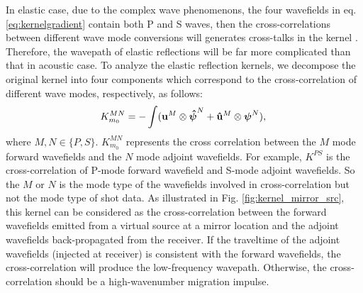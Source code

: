 In elastic case, due to the complex wave phenomenons, the four wavefields in eq.
\eqref{eq:kernelgradient} contain both P and S waves, then the cross-correlations between
different wave mode conversions will generates cross-talks in the kernel \cite[]{Wang2017ERTI}. Therefore, the wavepath of elastic reflections will 
be far more complicated than that in acoustic case.
To analyze the elastic reflection kernels, 
we decompose the original kernel into four components which 
correspond to the cross-correlation of different wave modes, respectively, as follows:
\begin{equation}
    K_{m_0}^{MN}     
    =-\int(\mathbf{u}^M\otimes\boldsymbol{{}\hat\psi}^N
	+\mathbf{\hat{u}}^M\otimes\boldsymbol{{}\psi}^N),\\
    \label{eq:decompkernel} 
\end{equation}
where $M,N\in\{P,S\}$.
$K_{m_0}^{MN}$ represents the cross correlation between the $M$ mode forward wavefields and the 
$N$ mode adjoint wavefields. 
For example, $K^{PS}$ is the
cross-correlation of P-mode forward wavefield and S-mode adjoint wavefields. So the $M$ or $N$ is
the mode type of the wavefields involved in cross-correlation but not 
the mode type of shot data.
As illustrated in Fig. \ref{fig:kernel_mirror_src}, this
kernel can be considered as the cross-correlation between the forward wavefields
emitted from a virtual source at a mirror location and the adjoint wavefields
back-propagated from the receiver. If the traveltime of the adjoint wavefields (injected at
receiver) is consistent with the forward wavefields, the cross-correlation will
produce the low-frequency wavepath. Otherwise, the cross-correlation
should be a high-wavenumber migration impulse. 

